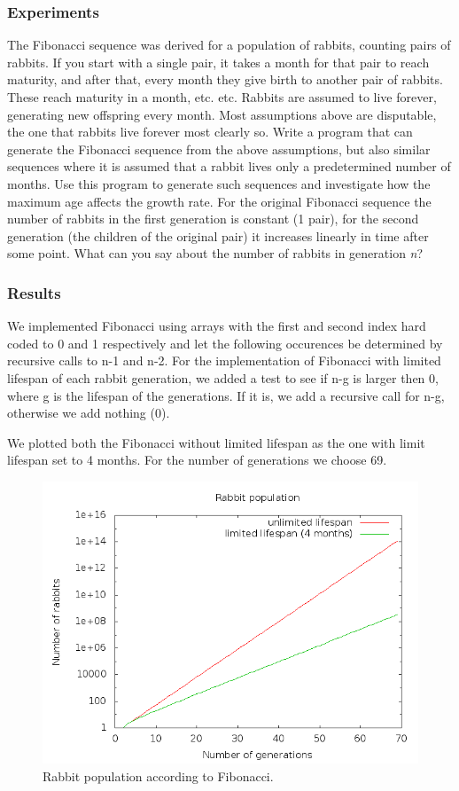 \documentclass[a4paper,10pt]{article}
\begin{document}
  \subsubsection{Experiments}
  The Fibonacci sequence was derived for a population of rabbits, counting
  pairs of rabbits. If you start with a single pair, it takes a month for
  that pair to reach maturity, and after that, every month they give birth
  to another pair of rabbits. These reach maturity in a month, etc. etc.
  Rabbits are assumed to live forever, generating new offspring every month.
  Most assumptions above are disputable, the one that rabbits live forever
  most clearly so. Write a program that can generate the Fibonacci sequence
  from the above assumptions, but also similar sequences where it is assumed
  that a rabbit lives only a predetermined number of months. Use this 
  program to generate such sequences and investigate how the maximum age
  affects the growth rate.
  For the original Fibonacci sequence the number of rabbits in the first 
  generation is constant (1 pair), for the second generation (the children
  of the original pair) it increases linearly in time after some point. What
  can you say about the number of rabbits in generation \emph{n}?

  \subsubsection{Results}
  We implemented Fibonacci using arrays with the first and second index hard
  coded to 0 and 1 respectively and let the following occurences be
  determined by recursive calls to n-1 and n-2. For the implementation of
  Fibonacci with limited lifespan of each rabbit generation, we added a test
  to see if n-g is larger then 0, where g is the lifespan of the
  generations. If it is, we add a recursive call for n-g, otherwise we add
  nothing (0).

  We plotted both the Fibonacci without limited lifespan as the one with
  limit lifespan set to 4 months. For the number of generations we choose
  69.

  \begin{figure}[H]
    \includegraphics[scale=0.5]{plot.png}
    \caption{Rabbit population according to Fibonacci.}
  \end{figure}
\end{document}

